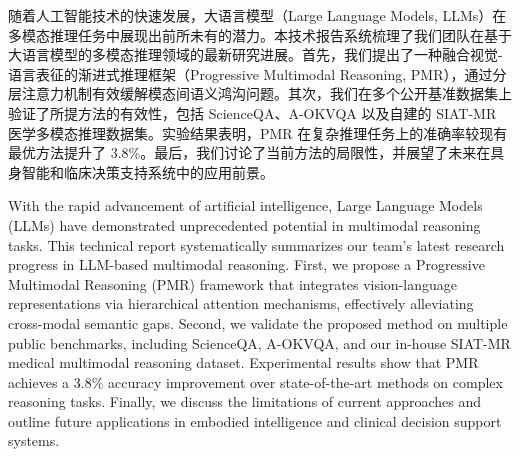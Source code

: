 
\begin{trabstractcn}
随着人工智能技术的快速发展，大语言模型（Large Language Models, LLMs）在多模态推理任务中展现出前所未有的潜力。本技术报告系统梳理了我们团队在基于大语言模型的多模态推理领域的最新研究进展。首先，我们提出了一种融合视觉-语言表征的渐进式推理框架（Progressive Multimodal Reasoning, PMR），通过分层注意力机制有效缓解模态间语义鸿沟问题。其次，我们在多个公开基准数据集上验证了所提方法的有效性，包括 ScienceQA、A-OKVQA 以及自建的 SIAT-MR 医学多模态推理数据集。实验结果表明，PMR 在复杂推理任务上的准确率较现有最优方法提升了 3.8\%。最后，我们讨论了当前方法的局限性，并展望了未来在具身智能和临床决策支持系统中的应用前景。
\end{trabstractcn}

\vspace{1em}

\begin{trabstract}
With the rapid advancement of artificial intelligence, Large Language Models (LLMs) have demonstrated unprecedented potential in multimodal reasoning tasks. This technical report systematically summarizes our team's latest research progress in LLM-based multimodal reasoning. First, we propose a Progressive Multimodal Reasoning (PMR) framework that integrates vision-language representations via hierarchical attention mechanisms, effectively alleviating cross-modal semantic gaps. Second, we validate the proposed method on multiple public benchmarks, including ScienceQA, A-OKVQA, and our in-house SIAT-MR medical multimodal reasoning dataset. Experimental results show that PMR achieves a 3.8\% accuracy improvement over state-of-the-art methods on complex reasoning tasks. Finally, we discuss the limitations of current approaches and outline future applications in embodied intelligence and clinical decision support systems.
\end{trabstract}

\newpage
